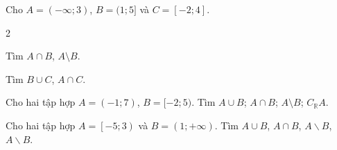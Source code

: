 \begin{bt}%
	Cho $A=(-\infty;3)$, $B=(1;5]$ và $C=[-2;4]$.
	\begin{enumEX}{2}
		\item Tìm $A\cap B$, $A\setminus B$.
		\item Tìm $B\cup C$, $A\cap C$.
	\end{enumEX}
	\loigiai{
		\begin{enumEX}{2}
			\item $A\cap B=(1;3)$, $A\setminus B=(-\infty;1]$.
			\item $B\cup C=[-2;5]$, $A\cap C=[-2;3)$.
	\end{enumEX}
	}
\end{bt}

\begin{bt}%
Cho hai tập hợp $A=(-1 ; 7)$, $B=[-2 ; 5)$. Tìm $A \cup B$; $A \cap B$; $A \setminus B$; $C_{\mathbb{R}} A$.
\loigiai{
$A \cup B=[-2;7)$, $A \cap B=(-1;5)$, $A \setminus B=[5;7)$, $C_{\mathbb{R}}A=(-\infty;-1] \cup [7;+\infty)$
}
\end{bt}

\begin{bt}%
	Cho hai tập hợp $A=\left[-5;3\right)$ và $B=(1;+\infty)$. 
	Tìm $A \cup B$, $A\cap B$, $A \backslash B$, $A \backslash B$. 
	\loigiai{ 
		Ta có $A \cup B= [-5;+\infty)$ , $A\cap B= (1;3)$, $A \backslash B =[-5;1]$, $B \backslash A=[3;+\infty)$.	}
\end{bt}

